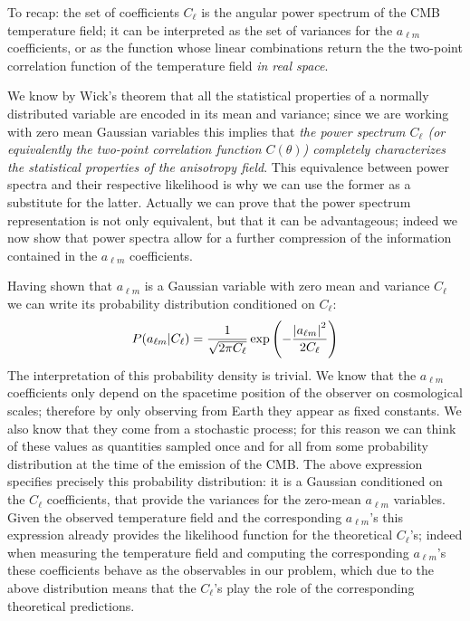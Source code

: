 To recap: the set of coefficients $C_\ell$ is the angular power spectrum of the CMB temperature field; it can be interpreted as the set of variances for the $a_{\ell m}$ coefficients, or as the function whose linear combinations return the the two-point correlation function of the temperature field \emph{in real space}.

We know by Wick's theorem that all the statistical properties of a normally distributed variable are encoded in its mean and variance; since we are working with zero mean Gaussian variables this implies that \emph{the power spectrum $C_\ell$ (or equivalently the two-point correlation function $C(\theta)$) completely characterizes the statistical properties of the anisotropy field}. This equivalence between power spectra and their respective likelihood is why we can use the former as a substitute for the latter. Actually we can prove that the power spectrum representation is not only equivalent, but that it can be advantageous; indeed we now show that power spectra allow for a further compression of the information contained in the $a_{\ell m}$ coefficients.

Having shown that $a_{\ell m}$ is a Gaussian variable with zero mean and variance $C_\ell$ we can write its probability distribution conditioned on $C_\ell$:
\begin{equation*}
    P(a_{\ell m}|C_\ell) = \frac{1}{\sqrt{2\pi C_\ell}}\exp \left(- \frac{\abs{a_{\ell m}}^2}{2 C_\ell}\right)
\end{equation*}
The interpretation of this probability density is trivial. We know that the $a_{\ell m}$ coefficients only depend on the spacetime position of the observer on cosmological scales; therefore by only observing from Earth they appear as fixed constants. We also know that they come from a stochastic process; for this reason we can think of these values as quantities sampled once and for all from some probability distribution at the time of the emission of the CMB. The above expression specifies precisely this probability distribution: it is a Gaussian conditioned on the $C_\ell$ coefficients, that provide the variances for the zero-mean $a_{\ell m}$ variables.
Given the observed temperature field and the corresponding $a_{\ell m}$'s this expression already provides the likelihood function for the theoretical $C_\ell$'s; indeed when measuring the temperature field and computing the corresponding $a_{\ell m}$'s these coefficients behave as the observables in our problem, which due to the above distribution means that the $C_\ell$'s play the role of the corresponding theoretical predictions.

